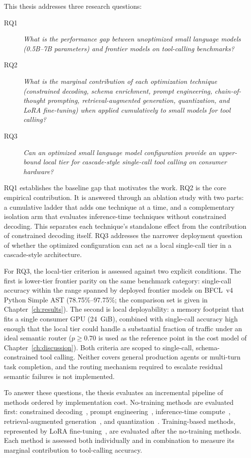 This thesis addresses three research questions:

\begin{description}
    \item[RQ1] \textit{What is the performance gap between unoptimized small language models (0.5B--7B parameters) and frontier models on tool-calling benchmarks?}
    \item[RQ2] \textit{What is the marginal contribution of each optimization technique (constrained decoding, schema enrichment, prompt engineering, chain-of-thought prompting, retrieval-augmented generation, quantization, and LoRA fine-tuning) when applied cumulatively to small models for tool calling?}
    \item[RQ3] \textit{Can an optimized small language model configuration provide an upper-bound local tier for cascade-style single-call tool calling on consumer hardware?}
\end{description}

\noindent RQ1 establishes the baseline gap that motivates the work. RQ2 is the core empirical contribution. It is answered through an ablation study with two parts: a cumulative ladder that adds one technique at a time, and a complementary isolation arm that evaluates inference-time techniques without constrained decoding. This separates each technique's standalone effect from the contribution of constrained decoding itself. RQ3 addresses the narrower deployment question of whether the optimized configuration can act as a local single-call tier in a cascade-style architecture.

For RQ3, the local-tier criterion is assessed against two explicit conditions.
The first is lower-tier frontier parity on the same benchmark category:
single-call accuracy within the range spanned by deployed frontier models on
BFCL~v4 Python Simple AST (78.75\%--97.75\%; the comparison set is given in
Chapter~\ref{ch:results}). The second is local deployability: a memory footprint
that fits a single consumer GPU (24~GiB), combined with single-call accuracy
high enough that the local tier could handle a substantial fraction of traffic
under an ideal semantic router ($p \geq 0.70$ is used as the reference point in
the cost model of Chapter~\ref{ch:discussion}). Both criteria are scoped to
single-call, schema-constrained tool calling. Neither covers general production
agents or multi-turn task completion, and the routing mechanism required to
escalate residual semantic failures is not implemented.

To answer these questions, the thesis evaluates an incremental pipeline of methods ordered by implementation cost. No-training methods are evaluated first: constrained decoding~\cite{willard2023efficient}, prompt engineering~\cite{brown2020language}, inference-time compute~\cite{wei2022chain}, retrieval-augmented generation~\cite{lewis2020retrieval}, and quantization~\cite{lin2024awq}. Training-based methods, represented by LoRA fine-tuning~\cite{hu2022lora}, are evaluated after the no-training methods. Each method is assessed both individually and in combination to measure its marginal contribution to tool-calling accuracy.

